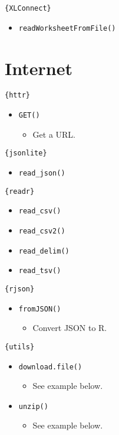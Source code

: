 \documentclass[
]{book}
\providecommand{\tightlist}{%
  \setlength{\itemsep}{0pt}\setlength{\parskip}{0pt}}
\begin{document}
\texttt{\{XLConnect\}}

\begin{itemize}
\tightlist
\item
  \texttt{readWorksheetFromFile()}
\end{itemize}

\hypertarget{internet}{%
\section{Internet}\label{internet}}

\texttt{\{httr\}}

\begin{itemize}
\tightlist
\item
  \texttt{GET()}

  \begin{itemize}
  \tightlist
  \item
    Get a URL.
  \end{itemize}
\end{itemize}

\texttt{\{jsonlite\}}

\begin{itemize}
\tightlist
\item
  \texttt{read\_json()}
\end{itemize}

\texttt{\{readr\}}

\begin{itemize}
\tightlist
\item
  \texttt{read\_csv()}
\item
  \texttt{read\_csv2()}
\item
  \texttt{read\_delim()}
\item
  \texttt{read\_tsv()}
\end{itemize}

\texttt{\{rjson\}}

\begin{itemize}
\tightlist
\item
  \texttt{fromJSON()}

  \begin{itemize}
  \tightlist
  \item
    Convert JSON to R.
  \end{itemize}
\end{itemize}

\texttt{\{utils\}}

\begin{itemize}
\tightlist
\item
  \texttt{download.file()}

  \begin{itemize}
  \tightlist
  \item
    See example below.
  \end{itemize}
\item
  \texttt{unzip()}

  \begin{itemize}
  \tightlist
  \item
    See example below.
  \end{itemize}
\end{itemize}
\end{document}

